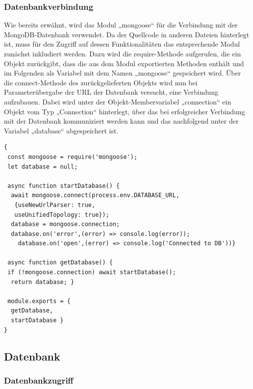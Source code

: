 \subsubsection{Datenbankverbindung}
Wie bereits erwähnt, wird das Modul „mongoose“ für die Verbindung mit der MongoDB-Datenbank verwendet. 
Da der Quellcode in anderen Dateien hinterlegt ist, muss für den Zugriff auf dessen Funktionalitäten das entsprechende Modul zunächst inkludiert werden. Dazu wird die require-Methode aufgerufen, die ein Objekt zurückgibt, dass die aus dem Modul exportierten Methoden enthält und im Folgenden als Variabel mit dem Namen „mongoose“ gespeichert wird. 
\newline
Über die connect-Methode des zurückgelieferten Objekts wird nun bei Parameterübergabe der URL der Datenbank versucht, eine Verbindung aufzubauen.  
Dabei wird unter der Objekt-Membervariabel  „connection“ ein Objekt vom Typ „Connection“ hinterlegt, über das bei erfolgreicher Verbindung mit der Datenbank kommuniziert werden kann und das nachfolgend unter der Variabel „database“ abgespeichert ist.\\

\begin{lstlisting}[caption=Verbindung zur MongoDB-Datenbank, label=lst:mongodbconnection]
{
 const mongoose = require('mongoose');
 let database = null;

 async function startDatabase() {
  await mongoose.connect(process.env.DATABASE_URL, 
   {useNewUrlParser: true,
   useUnifiedTopology: true}); 
  database = mongoose.connection;
  database.on('error',(error) => console.log(error));
  	database.on('open',(error) => console.log('Connected to DB'))}

 async function getDatabase() {
 if (!mongoose.connection) await startDatabase();
  return database; }

 module.exports = {
  getDatabase,
  startDatabase }
}
\end{lstlisting}

\subsection{Datenbank}


\subsubsection{Datenbankzugriff}                   


